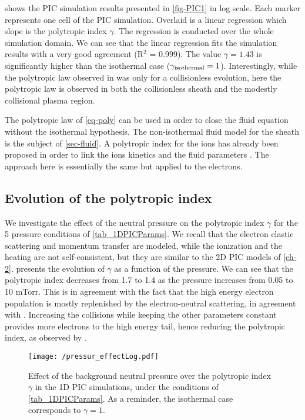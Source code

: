      shows the PIC simulation results presented in \cref{fig-PIC1} in log scale.
    Each marker represents one cell of the PIC simulation.
    Overlaid is a linear regression which slope is the polytropic index $\gamma$.
    The regression is conducted over the whole simulation domain.
    We can see that the linear regression fits the simulation results with a very good agreement (R$^2$ = 0.999).
    The value $\gamma = 1.43$ is significantly higher than the isothermal case ($\gamma_{\rm isothermal} = 1$).
    Interestingly, while the polytropic law observed in \citet{zhang2016} was only for a collisionless evolution, here the polytropic law is observed in both the collisionless sheath and the modestly collisional plasma region.

    The polytropic law of \cref{eq-poly} can be used in order to close the fluid equation without the isothermal hypothesis.
    The non-isothermal fluid model for the sheath is the subject of \cref{sec-fluid}.
    A polytropic index for the ions has already been proposed in order to link the ions kinetics and the fluid parameters \citep{kuhn2006,jelic2007}.
    The approach here is essentially the same but applied to the electrons.


  \subsection{Evolution of the polytropic index}
    \label{subsec-presurseffect}
    We investigate the effect of the neutral pressure on the polytropic index $\gamma$ for the 5 pressure conditions of \cref{tab_1DPICParams}.
    We recall that the electron elastic scattering and momentum transfer are modeled, while the ionization and the heating are not self-consistent, but they are similar to the \ac{2D} \ac{PIC} models of \cref{ch-2}.
     presents the evolution of $\gamma$ as a function of the pressure.
    We can see that the polytropic index decreases from 1.7 to 1.4 as the pressure increases from 0.05 to 10 mTorr.
    This is in agreement with the fact that the high energy electron population is mostly replenished by the electron-neutral scattering, in agreement with \citet{kaganovich2007}.
    Increasing the collisions while keeping the other parameters constant provides more electrons to the high energy tail, hence reducing the polytropic index, as observed by \citet{zhang2016}.

    \begin{figure}[!htbp]
      \centering
      \texttt{[image: /pressur\_effectLog.pdf]}
      \caption{Effect of the background neutral pressure over the polytropic index $\gamma$ in the \acs{1D} \acs{PIC} simulations, under the conditions of \cref{tab_1DPICParams}. As a reminder, the isothermal case corresponds to $\gamma=1$.}
      \label{fig-p}
    \end{figure}


